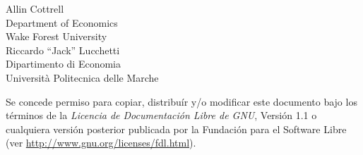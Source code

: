 \documentclass[oneside,spanish]{book}
\begin{document}
\VerbatimFootnotes

\setlength{\parindent}{0pt}
\setlength{\parskip}{1ex}



\thispagestyle{empty}

\begin{center}



{\large \sffamily
Allin Cottrell\\
Department of Economics\\
Wake Forest University\\

\vspace{20pt}
Riccardo ``Jack'' Lucchetti\\
Dipartimento di Economia\\
Università Politecnica delle Marche\\


\vspace{20pt}

}

\end{center}
\clearpage


\thispagestyle{empty}


\vspace*{2in}

Se concede permiso para copiar, distribuír y/o modificar este documento bajo
los términos de la \emph{Licencia de Documentación Libre de GNU}, Versión 1.1
o cualquiera versión posterior publicada por la Fundación para el Software Libre
(ver \url{http://www.gnu.org/licenses/fdl.html}).

\clearpage


\pagestyle{headings}

\tableofcontents

\clearpage








\clearpage

\end{document}
